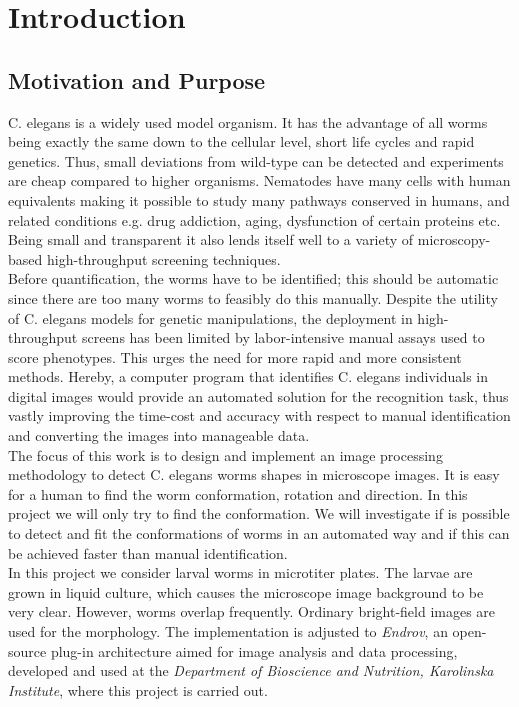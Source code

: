 \thispagestyle{empty}
\chapter{Introduction}

\section{Motivation and Purpose}
\label{sec:motivation}

C. elegans is a widely used model organism. It has the advantage of all worms 
being exactly the same down to the cellular level, short life cycles and rapid
 genetics. Thus, small deviations from wild-type can be detected and experiments
 are cheap compared to higher organisms. Nematodes have many cells with human
 equivalents making it possible to study many pathways conserved in humans, 
and related conditions e.g. drug addiction, aging, dysfunction of certain
 proteins etc. Being small and transparent it also lends itself well to a 
variety of microscopy-based high-throughput screening techniques.\\
 
Before quantification, the worms have to be identified; this should be 
automatic since there are too many worms to feasibly do this manually.
Despite the utility of C. elegans models for genetic 
manipulations, the deployment in high-throughput screens has been limited by 
labor-intensive manual assays used to score phenotypes. This urges the need for more rapid and more 
consistent methods.
Hereby, a computer
program that identifies C. elegans individuals in digital images would 
provide an automated solution for the recognition task, thus vastly 
improving the time-cost and accuracy with respect to manual identification 
and converting the images into manageable data.\\

The focus of this work is to design and implement an image processing
methodology to detect C. elegans worms shapes in microscope images.
It is easy for a human to find the worm conformation, rotation and direction. In this project we will only 
try to find the conformation. We will investigate if is possible to detect and fit the conformations of worms 
in an automated way and if this can be achieved faster than manual identification.\\

In this project we consider larval worms in microtiter plates. The larvae are 
grown in liquid culture, which causes the microscope image background to be 
very clear. However, worms overlap frequently. Ordinary bright-field images are 
used for the morphology. The implementation is adjusted to \emph{Endrov},
an open-source plug-in architecture aimed for image analysis and data processing, developed and used at the 
\emph{Department of Bioscience and Nutrition, Karolinska Institute},
where this project is carried out.

